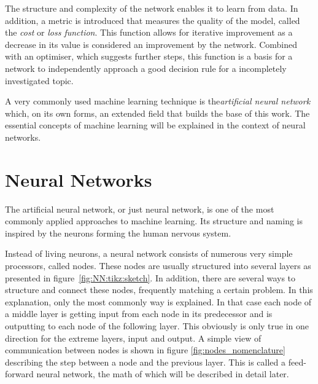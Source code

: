 The structure and complexity of the network enables it to learn from data. In addition, a metric is introduced that measures the quality of the model, called the \emph{cost} or \emph{loss function}. This function allows for iterative improvement as a decrease in its value is considered an improvement by the network. Combined with an optimiser, which suggests further steps, this function is a basis for a network to independently approach a good decision rule for a incompletely investigated topic.

A very commonly used machine learning technique is the\emph{artificial neural network} which, on its own forms, an extended field that builds the base of this work. The essential concepts of machine learning will be explained in the context of neural networks.

\section{Neural Networks}

The artificial neural network, or just neural network, is one of the most commonly applied approaches to machine learning. Its structure and naming is inspired by the neurons forming the human nervous system.

Instead of living neurons, a neural network consists of numerous very simple processors, called nodes.
 These nodes are usually structured into several layers as presented in figure~\ref{fig:NN:tikz:sketch}. In addition, there are several ways to structure and connect these nodes, frequently matching a certain problem. In this explanation, only the most commonly way is explained. In that case each node of a middle layer is getting input from each node in its predecessor and is outputting to each node of the following layer. This obviously is only true in one direction for the extreme layers, input and output. A simple view of communication between nodes is shown in figure \ref{fig:nodes_nomenclature} describing the step between a node and the previous layer. This is called a feed-forward neural network, the math of which will be described in detail later.
 
